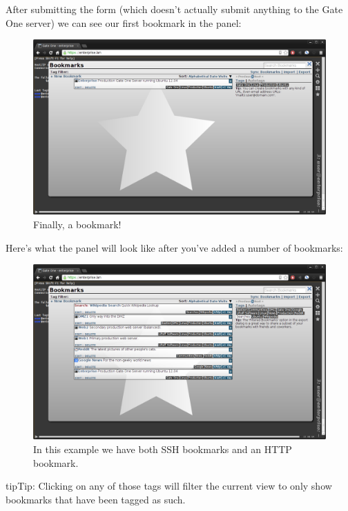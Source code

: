 \documentclass[letterpaper,10pt,openany]{sphinxmanual}
\begin{document}
After submitting the form (which doesn't actually submit anything to the Gate One server) we can see our first bookmark in the panel:
\begin{figure}[htbp]
\centering
\capstart

\includegraphics{gateone_new_bookmark3.png}
\caption{Finally, a bookmark!}\end{figure}

Here's what the panel will look like after you've added a number of bookmarks:
\begin{figure}[htbp]
\centering
\capstart

\includegraphics{gateone_new_bookmark4.png}
\caption{In this example we have both SSH bookmarks and an HTTP bookmark.}\end{figure}

\begin{notice}{tip}{Tip:}
Clicking on any of those tags will filter the current view to only show bookmarks that have been tagged as such.
\end{notice}
\end{document}
